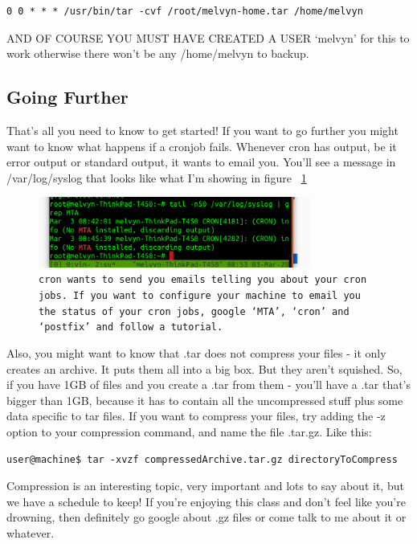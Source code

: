 \documentclass[12pt,a4paper]{article}
\begin{document}
\begin{lstlisting}
0 0 * * * /usr/bin/tar -cvf /root/melvyn-home.tar /home/melvyn
\end{lstlisting}

AND OF COURSE YOU MUST HAVE CREATED A USER `melvyn' for this to work otherwise
there won't be any /home/melvyn to backup.

\subsection{Going Further}
That's all you need to know to get started! If you want to go further you might
want to know what happens if a cronjob fails. Whenever cron has output, be it
error output or standard output, it wants to email you. You'll see a message in
/var/log/syslog that looks like what I'm showing in figure ~\ref{fig:mta}

\begin{figure}[h]
\centering
	\includegraphics[width=0.8\textwidth]{Images/cronOutput.png}
	\caption{{\small \texttt{cron wants to send you emails telling you about your cron jobs. If
you want to configure your machine to email you the status of your cron jobs,
google `MTA', `cron' and `postfix' and follow a tutorial.}}}
	\label{fig:mta}
\end{figure}

Also, you might want to know that .tar does not compress your files - it only
creates an archive. It puts them all into a big box. But they aren't squished.
So, if you have 1GB of files and you create a .tar from them - you'll have a
.tar that's bigger than 1GB, because it has to contain all the uncompressed
stuff plus some data specific to tar files. If you want to compress your files,
try adding the -z option to your compression command, and name the file .tar.gz.
Like this:

\begin{lstlisting}[style=term]
user@machine$ tar -xvzf compressedArchive.tar.gz directoryToCompress
\end{lstlisting}

Compression is an interesting topic, very important and lots to say about it,
but we have a schedule to keep! If you're enjoying this class and don't feel
like you're drowning, then definitely go google about .gz files or come talk to
me about it or whatever.
\end{document}
